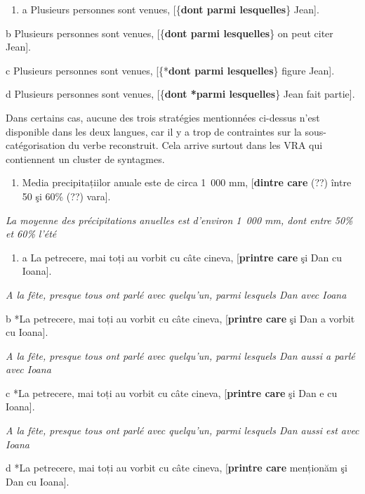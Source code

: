 \begin{enumerate}
\item \label{bkm:Ref295727189}a  Plusieurs personnes sont venues, [\{\textbf{dont {\textbar} parmi lesquelles}\} Jean]. 


\end{enumerate}
  b  Plusieurs personnes sont venues, [\{\textbf{dont {\textbar} parmi lesquelles}\} on peut citer Jean].

  c  Plusieurs personnes sont venues, [\{*\textbf{dont {\textbar} parmi lesquelles}\} figure Jean].

  d  Plusieurs personnes sont venues, [\{\textbf{dont {\textbar} *parmi lesquelles}\} Jean fait partie].

Dans certains cas, aucune des trois stratégies mentionnées ci-dessus  n'est disponible dans les deux langues, car il y a trop de contraintes sur la sous-catégorisation du verbe reconstruit. Cela arrive surtout dans les VRA qui contiennent un cluster de syntagmes.


\begin{enumerate}
\item Media precipitațiilor anuale este de circa 1~000 mm, [\textbf{dintre care} (??) între 50 şi 60\% (??) vara]. 


\end{enumerate}
{\itshape
La moyenne des précipitations anuelles est d'environ 1~000 mm, dont entre 50\% et 60\% l'été} 


\begin{enumerate}
\item a  La petrecere, mai toți au vorbit cu câte cineva, [\textbf{printre care} şi Dan cu Ioana].  


\end{enumerate}
{\itshape
A la fête, presque tous ont parlé avec quelqu'un, parmi lesquels Dan avec Ioana}

  b  *La petrecere, mai toți au vorbit cu câte cineva, [\textbf{printre care} şi Dan a vorbit cu Ioana].

{\itshape
A la fête, presque tous ont parlé avec quelqu'un, parmi lesquels Dan aussi a parlé avec Ioana}

  c  *La petrecere, mai toți au vorbit cu câte cineva, [\textbf{printre care} şi Dan e cu Ioana].

{\itshape
A la fête, presque tous ont parlé avec quelqu'un, parmi lesquels Dan aussi est avec Ioana}

  d  *La petrecere, mai toți au vorbit cu câte cineva, [\textbf{printre care} menționăm şi Dan cu Ioana].

